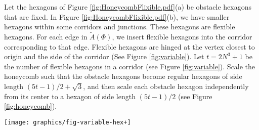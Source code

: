 Let the hexagons of Figure \ref{fig:HoneycombFlixible.pdf}(a) be obstacle hexagons that are fixed.
In Figure \ref{fig:HoneycombFlixible.pdf}(b), we have smaller hexagons within some corridors and junctions.
These hexagons are flexible hexagons.
For each edge in $\tilde{A}(\Phi)$, we insert flexible hexagons into the corridor corresponding to that edge.
Flexible hexagons are hinged at the vertex closest to origin and the side of the corridor (See Figure \ref{fig:variable}).
Let $t=2N^3+1$ be the number of flexible hexagons in a corridor (see Figure \ref{fig:variable}). 
Scale the honeycomb such that the obstacle hexagons become regular hexagons of side length $(5t-1)/2+\sqrt{3}$, and then scale each obstacle hexagon independently from its center to a hexagon of side length $(5t-1)/2$ (see Figure \ref{fig:honeycomb}). 

\begin{minipage}{\linewidth}
\begin{center}
\texttt{[image: graphics/fig-variable-hex+]}
\label{fig:variable}
\end{center}
\end{minipage}

